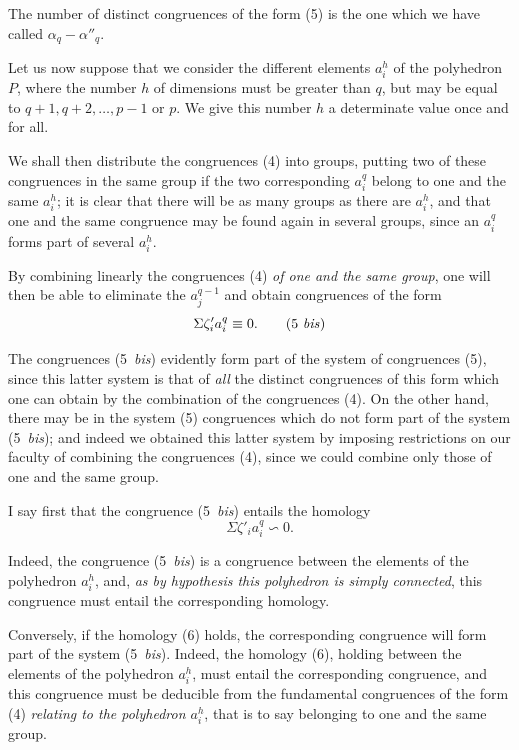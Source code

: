 \documentclass{article}
\begin{document}
The number of distinct congruences of the form (5) is the one which we have called $\alpha_{q} - \alpha''_{q}$.

Let us now suppose that we consider the different elements $a^{h}_{i}$ of the polyhedron $P$, where the number $h$ of dimensions must be greater than $q$, but may be equal to $q+1, q+2, \ldots, p-1$ or $p$. We give this number $h$ a determinate value once and for all.

We shall then distribute the congruences (4) into groups, putting two of these congruences in the same group if the two corresponding $a^{q}_{i}$ belong to one and the same $a^{h}_{i}$; it is clear that there will be as many groups as there are $a^{h}_{i}$, and that one and the same congruence may be found again in several groups, since an $a^{q}_{i}$ forms part of several $a^{h}_{i}$.

By combining linearly the congruences (4) \emph{of one and the same group}, one will then be able to eliminate the $a^{q-1}_{j}$ and obtain congruences of the form
\[ \Sigma \zeta'_{i} a^{q}_{i} \equiv 0. \tag{5 \textit{bis}} \]

The congruences (5~\emph{bis}) evidently form part of the system of congruences (5), since this latter system is that of \emph{all} the distinct congruences of this form which one can obtain by the combination of the congruences (4). On the other hand, there may be in the system (5) congruences which do not form part of the system (5~\emph{bis}); and indeed we obtained this latter system by imposing restrictions on our faculty of combining the congruences (4), since we could combine only those of one and the same group.

I say first that the congruence (5~\emph{bis}) entails the homology
\[ \Sigma \zeta'_{i} a^{q}_{i} \backsim 0. \tag{6} \]

Indeed, the congruence (5~\emph{bis}) is a congruence between the elements of the polyhedron $a^{h}_{i}$, and, \emph{as by hypothesis this polyhedron is simply connected}, this congruence must entail the corresponding homology.

Conversely, if the homology (6) holds, the corresponding congruence will form part of the system (5~\emph{bis}). Indeed, the homology (6), holding between the elements of the polyhedron $a^{h}_{i}$, must entail the corresponding congruence, and this congruence must be deducible from the fundamental congruences of the form (4) \emph{relating to the polyhedron $a^{h}_{i}$}, that is to say belonging to one and the same group.
\end{document}
